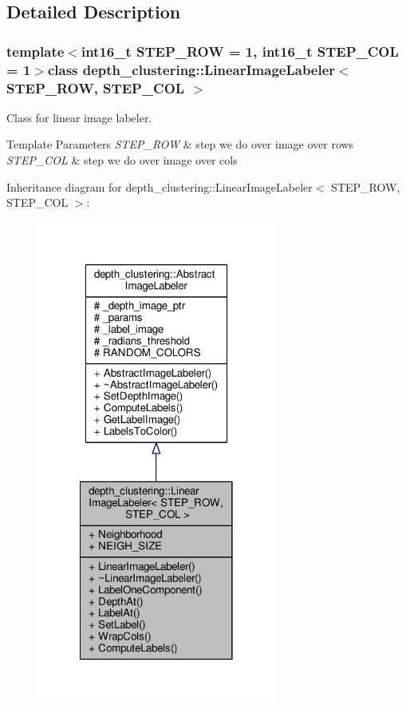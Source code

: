 \subsection{Detailed Description}
\subsubsection*{template$<$int16\-\_\-t S\-T\-E\-P\-\_\-\-R\-O\-W = 1, int16\-\_\-t S\-T\-E\-P\-\_\-\-C\-O\-L = 1$>$class depth\-\_\-clustering\-::\-Linear\-Image\-Labeler$<$ S\-T\-E\-P\-\_\-\-R\-O\-W, S\-T\-E\-P\-\_\-\-C\-O\-L $>$}

Class for linear image labeler. 


\begin{DoxyTemplParams}{Template Parameters}
{\em S\-T\-E\-P\-\_\-\-R\-O\-W} & step we do over image over rows \\
\hline
{\em S\-T\-E\-P\-\_\-\-C\-O\-L} & step we do over image over cols \\
\hline
\end{DoxyTemplParams}


Inheritance diagram for depth\-\_\-clustering\-:\-:Linear\-Image\-Labeler$<$ S\-T\-E\-P\-\_\-\-R\-O\-W, S\-T\-E\-P\-\_\-\-C\-O\-L $>$\-:
\nopagebreak
\begin{figure}[H]
\begin{center}
\leavevmode
\includegraphics[width=222pt]{classdepth__clustering_1_1LinearImageLabeler__inherit__graph}
\end{center}
\end{figure}


